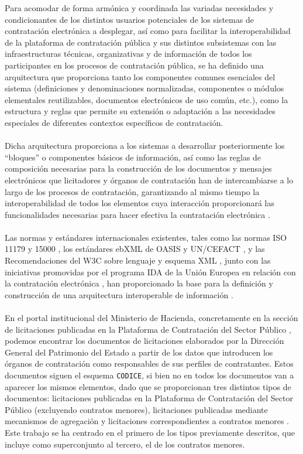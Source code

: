             \noindent Para acomodar de forma armónica y coordinada las variadas necesidades y condicionantes de los distintos usuarios potenciales de los sistemas de contratación electrónica a desplegar, así como para facilitar la interoperabilidad de la plataforma de contratación pública y sus distintos subsistemas con las infraestructuras técnicas, organizativas y de información de todos los participantes en los procesos de contratación pública, se ha definido una arquitectura \cite{CODICEIMPL} que proporciona tanto los componentes comunes esenciales del sistema (definiciones y denominaciones normalizadas, componentes o módulos elementales reutilizables, documentos electrónicos de uso común, etc.), como la estructura y reglas que permite su extensión o adaptación a las necesidades especiales de diferentes contextos específicos de contratación.
            \\ \\
            Dicha arquitectura proporciona a los sistemas a desarrollar posteriormente los “bloques” o componentes básicos de información, así como las reglas de composición necesarias para la construcción de los documentos y mensajes electrónicos que licitadores y órganos de contratación han de intercambiarse a lo largo de los procesos de contratación, garantizando al mismo tiempo la interoperabilidad de todos los elementos cuya interacción proporcionará las funcionalidades necesarias para hacer efectiva la contratación electrónica \cite{CODICEFORM}.
            \\ \\
            Las normas y estándares internacionales existentes, tales como las normas ISO 11179 \cite{ISOMDR} y 15000 \cite{ISOEBXML}, los estándares ebXML de OASIS \cite{EBXML} y UN/CEFACT \cite{UNCEFACT}, y las Recomendaciones del W3C sobre lenguaje y esquema XML \cite{XML}, junto con las iniciativas promovidas por el programa IDA de la Unión Europea en relación con la contratación electrónica \cite{UEIDA}, han proporcionado la base para la definición y construcción de una arquitectura interoperable de información \cite{CODICE}.
            \\ \\
            En el portal institucional del Ministerio de Hacienda, concretamente en la sección de licitaciones publicadas en la Plataforma de Contratación del Sector Público \cite{PORTALHAC}, podemos encontrar los documentos de licitaciones elaborados por la Dirección General del Patrimonio del Estado a partir de los datos que introducen los órganos de contratación como responsables de sus perfiles de contratantes. Estos documentos siguen el esquema \texttt{CODICE}, si bien no en todos los documentos van a aparecer los mismos elementos, dado que se proporcionan tres distintos tipos de documentos: licitaciones publicadas en la Plataforma de Contratación del Sector Público (excluyendo contratos menores), licitaciones publicadas mediante mecanismos de agregación y licitaciones correspondientes a contratos menores \cite{CODICETIPOS}. Este trabajo se ha centrado en el primero de los tipos previamente descritos, que incluye como superconjunto al tercero, el de los contratos menores.
            
